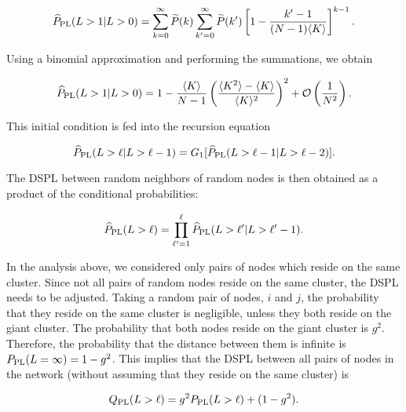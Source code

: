 \documentclass[preprint,pre,superscriptaddress,showpacs]{revtex4}
\begin{document}
\begin{equation}
\widehat P_{\rm PL}(L>1 | L>0) 
=
\sum_{k=0}^{\infty} 
\widetilde P(k)
\sum_{k'=0}^{\infty}
\widetilde P(k')
\left[ 1 - \frac{k'-1}{(N-1) \langle K \rangle} \right]^{k-1}. 
\label{eq:hat_m1}
\end{equation}

\noindent
Using a binomial approximation 
and performing the summations,
we obtain

\begin{equation}
\widehat P_{\rm PL}(L>1 | L>0) = 
1 -
\frac{\langle K \rangle}{N-1} 
\left( \frac{ \langle K^2 \rangle - \langle K \rangle}{\langle K \rangle^2} \right)^2
+ {\cal O} \left(\frac{1}{N^2}  \right).
\label{eq:L1hat}
\end{equation}

\noindent
This initial condition is fed into the recursion equation

\begin{equation}
\widehat P_{\rm PL}(L>\ell | L>\ell-1) =
G_1[ \widehat P_{\rm PL}(L>\ell-1 | L> \ell-2)].
\label{eq:P_rec2sh}
\end{equation}

\noindent
The DSPL between random neighbors of random nodes is then obtained
as a product of the conditional probabilities:

\begin{equation}
\widehat P_{\rm PL}(L>\ell) = \prod_{\ell^{\prime}=1}^{\ell}
\widehat P_{\rm PL}(L>\ell^{\prime} | L>\ell^{\prime}-1).
\label{eq:prodh}
\end{equation}

In the analysis above, we considered only pairs of nodes which
reside on the same cluster.
Since not all pairs of random nodes reside on the same cluster,
the DSPL needs to be adjusted.
Taking a random pair of nodes, $i$ and $j$, the probability
that they reside on the same cluster
is negligible, unless they both reside on the giant cluster.
The probability that both nodes reside on the giant cluster is $g^2$.
Therefore, the probability that the distance between them is
infinite is $P_{\rm PL}(L=\infty) = 1-g^2$.
This implies that the DSPL between
all pairs of nodes in the network (without assuming that they
reside on the same cluster) is

\begin{equation}
Q_{\rm PL}(L>\ell) = g^2 P_{\rm PL}(L>\ell) + (1-g^2).
\label{eq:Q}
\end{equation}
\end{document}
